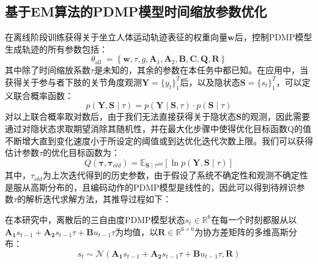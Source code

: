 \subsection{基于EM算法的PDMP模型时间缩放参数优化}
在离线阶段训练获得关于坐立人体运动轨迹表征的权重向量$\mathbf{w}$后，控制PDMP模型生成轨迹的所有参数包括：
\begin{equation}
    \theta_{\text {all }}=\left\{\mathbf{w}, \tau, g, \mathbf{A}_1, \mathbf{A}_2, \mathbf{B}, \mathbf{C}, \mathbf{Q}, \mathbf{R}\right\}
    \label{eq:4-16}
\end{equation}
其中除了时间缩放系数$\tau$是未知的，其余的参数在本任务中都已知。在应用中，当获得关于参与者下肢的关节角度观测$\mathbf{Y}=\{ y_t\}_1^T$后，以及隐状态$\mathbf{S}=\{s_t\}_1^T$，可以定义联合概率函数：
\begin{equation}
    p(\mathbf{Y}, \mathbf{S} \mid \tau) = 
    p(\mathbf{Y} \mid  \mathbf{S}, \tau) \cdot p(\mathbf{S} \mid  \tau)
    \label{eq:4-17}
\end{equation}
对以上联合概率取对数后，由于我们无法直接获得关于隐状态$\mathbf{S}$的观测，因此需要通过对隐状态求取期望消除其随机性，并在最大化步骤中使得优化目标函数Q的值不断增大直到变化速度小于所设定的阈值或到达优化迭代次数上限。我们可以获得估计参数$\tau$的优化目标函数为：
\begin{equation}
    Q\left(\boldsymbol{\tau}, \boldsymbol{\tau}_{old}\right)=\mathbb{E}_{\mathbf{S} \mid \tau^{old}}[\ln p(\mathbf{Y}, \mathbf{S} \mid \tau)]
    \label{eq:4-18}
\end{equation}
其中，$\tau_{old}$为上次迭代得到的历史参数，由于假设了系统不确定性和观测不确定性是服从高斯分布的，且编码动作的PDMP模型是线性的，因此可以得到待辨识参数$\tau$的解析迭代求解方法，其推导过程如下：

在本研究中，离散后的三自由度PDMP模型状态$s_t\in \mathbb{R}^{6}$在每一个时刻都服从以$\mathbf{A_1}s_{t-1}+\mathbf{A_2}s_{t-1}\tau+\mathbf{B}u_{t-1}\tau$为均值，以$\mathbf{R} \in \mathbb{R}^{6\times 6}$为协方差矩阵的多维高斯分布：
\begin{equation}
  s_t \sim \mathcal N(\mathbf{A_1}s_{t-1}+\mathbf{A_2}s_{t-1}\tau+\mathbf{B}u_{t-1}\tau,\mathbf{R})
  \label{eq:4-19}
\end{equation}

